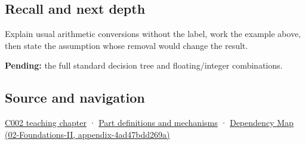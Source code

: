 \subsection{Recall and next depth}\label{recall-and-next-depth}

Explain usual arithmetic conversions without the label, work the example above, then state the assumption whose removal would change the result.

\textbf{Pending:} the full standard decision tree and floating/integer combinations.

\subsection{Source and navigation}\label{source-and-navigation}

\href{Continuous\%20Notes/Computing\%20Foundations\%20-\%20From\%20Bits\%20to\%20C++\%20and\%20Systems\%20APIs\#Arithmetic\%20becomes\%20a\%20policy}{C002 teaching chapter} · \hyperref[appendix-fd090d982a15]{Part definitions and mechanisms} · \href{}{Dependency Map (02-Foundations-II, appendix-4ad47bdd269a)}
